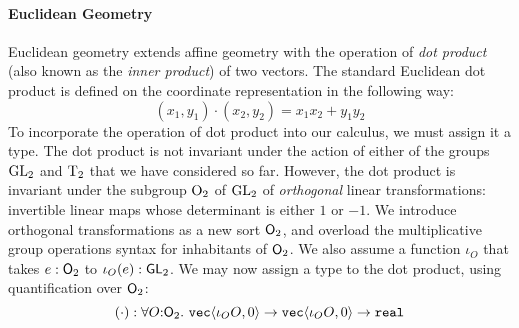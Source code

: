\paragraph{Euclidean Geometry} Euclidean geometry extends affine
geometry with the operation of \emph{dot product} (also known as the
\emph{inner product}) of two vectors. The standard Euclidean dot
product is defined on the coordinate representation in the following
way:
\begin{displaymath}
  (x_1,y_1) \cdot (x_2,y_2) = x_1x_2 + y_1y_2
\end{displaymath}
To incorporate the operation of dot product into our calculus, we must
assign it a type. The dot product is not invariant under the action of
either of the groups $\mathrm{GL}_2$ and $\mathrm{T}_2$ that we have considered
so far. However, the dot product is invariant under the subgroup
$\mathrm{O}_2$ of $\mathrm{GL}_2$ of \emph{orthogonal} linear transformations:
invertible linear maps whose determinant is either $1$ or $-1$. We
introduce orthogonal transformations as a new sort $\mathsf{O}_2$, and
overload the multiplicative group operations syntax for inhabitants of
$\mathsf{O}_2$. We also assume a function $\iota_O$ that takes $e :
\mathsf{O}_2$ to $\iota_O(e) : \mathsf{GL}_2$. We may now assign a type to
the dot product, using quantification over $\mathsf{O}_2$:
\begin{displaymath}
  (\cdot) : \forall O \mathord: \SynOrth_2.\ \tyPrim{vec}{\iota_OO, 0} \to \tyPrim{vec}{\iota_OO, 0} \to \tyPrimNm{real}
\end{displaymath}

